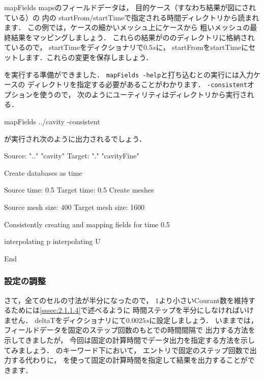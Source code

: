 mapFields mapsのフィールドデータは，
目的ケース（すなわち結果が図にされている）の
%
%
内の
startFrom/startTimeで指定される時間ディレクトリから読まれます．
この例では，ケースの細かいメッシュ上にケースから
粗いメッシュの最終結果をマッピングしましょう．
これらの結果がののディレクトリに格納されているので，
startTimeをディクショナリで$0.5\unit{s}$に，
startFromをstartTimeにセットします．これらの変更を保存しましょう．

を実行する準備ができました．
\texttt{mapFields -help}と打ち込むとの実行には入力ケースの
ディレクトリを指定する必要があることがわかります．
\texttt{-consistent}オプションを使うので，
次のようにユーティリティはディレクトリから実行される．
\begin{OFverbatim}[terminal]
mapFields ../cavity -consistent
\end{OFverbatim}
が実行され次のように出力されるでしょう．
\begin{OFverbatim}[baselinestretch=0.8, weight=\small]
Source: ".." "cavity"
Target: "." "cavityFine"

Create databases as time

Source time: 0.5
Target time: 0.5
Create meshes

Source mesh size: 400   Target mesh size: 1600

Consistently creating and mapping fields for time 0.5

    interpolating p
    interpolating U

End
\end{OFverbatim}

\subsubsection{設定の調整}
\label{sssec:2.1.5.4}
さて，全てのセルの寸法が半分になったので，
$1$より小さいCourant数を維持するためには\autoref{sssec:2.1.1.4}で述べるように
時間ステップを半分にしなければいけません．
deltaTをディクショナリにて$0.0025\unit{s}$に設定しましょう．
いままでは，フィールドデータを固定のステップ回数のもとでの時間間隔で
出力する方法を示してきましたが，
今回は固定の計算時間でデータ出力を指定する方法を示してみましょう．
のキーワード下において，
%
%
エントリで固定のステップ回数で出力する代わりに，
%
%
を使って固定の計算時間を指定して結果を出力することができます．

